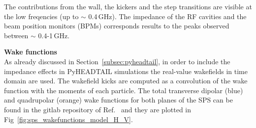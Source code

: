  The contributions from the wall, the kickers and the step transitions are visible at the low freqencies (up to $\sim$ 0.4\,GHz). The impedance of the RF cavities and the beam position monitors (BPMs) corresponds results to the peaks observed between $\sim$ 0.4-1\,GHz. 


\normalsize{\textbf{Wake functions}}\\
As already discussed in Section~\ref{subsec:pyheadtail}, in order to include the impedance effects in PyHEADTAIL simulations the real-value wakefields in time domain are used. The wakefield kicks are computed as a convolution of the wake function with the moments of each particle. The total transverse dipolar (blue) and quadrupolar (orange) wake functions for both planes of the SPS can be found in the gitlab repository of Ref.~\cite{sps_impedance_model_git} and they are plotted in Fig~\ref{fig:sps_wakefunctions_model_H_V}.

